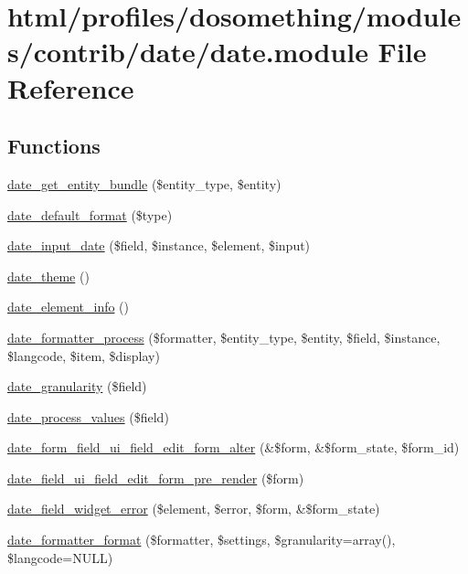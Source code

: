 \hypertarget{date_8module}{
\section{html/profiles/dosomething/modules/contrib/date/date.module File Reference}
\label{date_8module}
}
\subsection*{Functions}
\begin{DoxyCompactItemize}
\item 
\hyperlink{date_8module_a6ae854a04f35eae5dc91b242802728d0}{date\_\-get\_\-entity\_\-bundle} (\$entity\_\-type, \$entity)
\item 
\hyperlink{date_8module_a02c7a9a9c79c730064240ea129f062fc}{date\_\-default\_\-format} (\$type)
\item 
\hyperlink{date_8module_a7b44720b330f4318eb971537b64a27ad}{date\_\-input\_\-date} (\$field, \$instance, \$element, \$input)
\item 
\hyperlink{date_8module_a9f95819df33aab94d18f4461985d1028}{date\_\-theme} ()
\item 
\hyperlink{date_8module_a9e7c70efb10524fbd6c19512b08e697b}{date\_\-element\_\-info} ()
\item 
\hyperlink{date_8module_a4b019297d5d8f388aa2252ad62b3bfde}{date\_\-formatter\_\-process} (\$formatter, \$entity\_\-type, \$entity, \$field, \$instance, \$langcode, \$item, \$display)
\item 
\hyperlink{date_8module_a524c8837d65b4e1b512a7ea3ae33d016}{date\_\-granularity} (\$field)
\item 
\hyperlink{date_8module_a32f61cf4fd59beedd48c7a7be04c1693}{date\_\-process\_\-values} (\$field)
\item 
\hyperlink{date_8module_aa03c845a994be25b8d52c0ed091deebc}{date\_\-form\_\-field\_\-ui\_\-field\_\-edit\_\-form\_\-alter} (\&\$form, \&\$form\_\-state, \$form\_\-id)
\item 
\hyperlink{date_8module_aa7dfa6775921c3fbf7f8ceae70f6f519}{date\_\-field\_\-ui\_\-field\_\-edit\_\-form\_\-pre\_\-render} (\$form)
\item 
\hyperlink{date_8module_a227ffb57a05af9ccef60099ad0915228}{date\_\-field\_\-widget\_\-error} (\$element, \$error, \$form, \&\$form\_\-state)
\item 
\hyperlink{date_8module_a1fc73aa4ebc3a08f155eec42918f32c6}{date\_\-formatter\_\-format} (\$formatter, \$settings, \$granularity=array(), \$langcode=NULL)

\end{DoxyCompactItemize}
